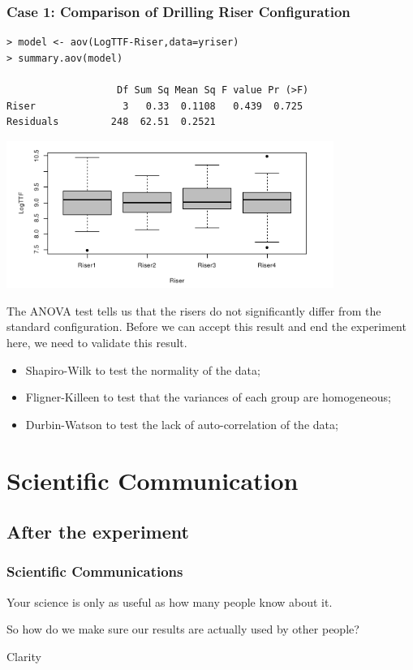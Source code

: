 \documentclass[10pt]{beamer}
\begin{document}
\begin{frame}
  \frametitle{Case 1: Comparison of Drilling Riser Configuration}
  
\begin{verbatim}
> model <- aov(LogTTF-Riser,data=yriser)
> summary.aov(model)

                   Df Sum Sq Mean Sq F value Pr (>F)
Riser               3   0.33  0.1108   0.439  0.725
Residuals         248  62.51  0.2521   
\end{verbatim}

\begin{center}
  \includegraphics[width=0.8\textwidth]{fig/riser_result}
\end{center}

\medskip

The ANOVA test tells us that the risers do not significantly differ
from the standard configuration. Before we can accept this result and
end the experiment here, we need to validate this result.

\bigskip

\begin{itemize}
\item Shapiro-Wilk to test the normality of the data;
\item Fligner-Killeen to test that the variances of each group are homogeneous;
\item Durbin-Watson to test the lack of auto-correlation of the data;
\end{itemize}

\end{frame}

\section{Scientific Communication}
\subsection{After the experiment}
\begin{frame}
  \frametitle{Scientific Communications}
  
  \begin{center}
    Your science is only as useful as how many people know about it.
  \end{center}

  \bigskip

  So how do we make sure our results are actually used by other people?

  \smallskip

  \alert{Clarity}
\end{frame}
\end{document}
